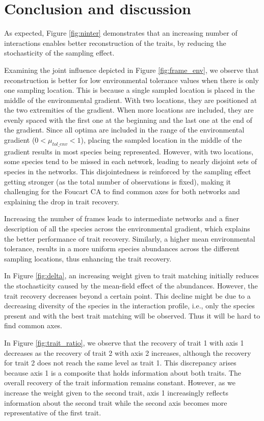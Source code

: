 \section{Conclusion and discussion}

As expected, Figure \ref{fig:ninter} demonstrates that an increasing number of interactions enables better reconstruction of the traits, by reducing the stochasticity of the sampling effect.


Examining the joint influence depicted in Figure \ref{fig:frame_env}, we observe that reconstruction is better for low environmental tolerance values when there is only one sampling location. This is because a single sampled location is placed in the middle of the environmental gradient. With two locations, they are positioned at the two extremities of the gradient. When more locations are included, they are evenly spaced with the first one at the beginning and the last one at the end of the gradient. 
Since all optima are included in the range of the environmental gradient ($0 < \mu_{tol\_env} < 1$), placing the sampled location in the middle of the gradient results in most species being represented. However, with two locations, some species tend to be missed in each network, leading to nearly disjoint sets of species in the networks. This disjointedness is reinforced by the sampling effect getting stronger (as the total number of observations is fixed), making it challenging for the Foucart CA to find common axes for both networks and explaining the drop in trait recovery.

Increasing the number of frames leads to intermediate networks and a finer description of all the species across the environmental gradient, which explains the better performance of trait recovery. Similarly, a higher mean environmental tolerance, results in a more uniform species abundances across the different sampling locations, thus enhancing the trait recovery.


In Figure \ref{fig:delta}, an increasing weight given to trait matching initially reduces the stochasticity caused by the mean-field effect of the abundances. However, the trait recovery decreases beyond a certain point. This decline might be due to a decreasing diversity of the species in the interaction profile, i.e., only the species present and with the best trait matching will be observed. Thus it will be hard to find common axes.


In Figure \ref{fig:trait_ratio}, we observe that the recovery of trait 1 with axis 1 decreases as the recovery of trait 2 with axis 2 increases, although the recovery for trait 2 does not reach the same level as trait 1. This discrepancy arises because axis 1 is a composite that holds information about both traits. The overall recovery of the trait information remains constant. However, as we increase the weight given to the second trait, axis 1 increasingly reflects information about the second trait while the second axis becomes more representative of the first trait.



